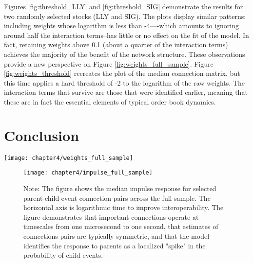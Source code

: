 Figures \ref{fig:threshold_LLY} and \ref{fig:threshold_SIG} demonstrate the results for two randomly selected stocks (LLY and SIG). The plots display similar patterns: including weights whose logarithm is less than -4—-which amounts to ignoring around half the interaction terms--has little or no effect on the fit of the model. In fact, retaining weights above 0.1 (about a quarter of the interaction terms) achieves the majority of the benefit of the network structure. These observations provide a new perspective on Figure \ref{fig:weights_full_sample}. Figure \ref{fig:weights_threshold} recreates the plot of the median connection matrix, but this time applies a hard threshold of -2 to the logarithm of the raw weights. The interaction terms that survive are those that were identified earlier, meaning that these are in fact the essential elements of typical order book dynamics.


\section{Conclusion}

\begin{sidewaysfigure}[ht!]
\small
\linespread{1}
\centering
\captionsetup{labelsep=colon, font=footnotesize, justification=centerfirst, width=\linewidth}
\caption{Median Event Connections}
\label{fig:weights_full_sample}
\texttt{[image: chapter4/weights\_full\_sample]}
\captionsetup{position=below, font=footnotesize, justification=justified, width=\linewidth}
\caption*{Note: The figure shows the median connection strength between event types across the full sample of stocks. Larger values indicate stronger connections, which are expected to generate a greater number of child events. (Left) The median of connection weight estimates using the raw weight matrix estimates. This figure identifies the most important connections in an absolute sense. (Right) The median connection weight matrix after normalizing parent-child weights by the estimated background rate of child events. This figure identifies the most important connections in a relative sense.}
\end{sidewaysfigure}

\begin{figure}[ht!]
\small
\linespread{1}
\centering
\captionsetup{labelsep=colon, font=footnotesize, justification=centerfirst, width=\linewidth}
\caption{Median Impulse Responses}
\label{fig:impulse_full_sample}
\texttt{[image: chapter4/impulse\_full\_sample]}
\captionsetup{position=below, font=footnotesize, justification=justified, width=\linewidth}
\caption*{Note: The figure shows the median impulse response for selected parent-child event connection pairs across the full sample. The horizontal axis is logarithmic time to improve interoperability. The figure demonstrates that important connections operate at timescales from one microsecond to one second, that estimates of connections pairs are typically symmetric, and that the model identifies the response to parents as a localized "spike" in the probability of child events.}
\end{figure}

